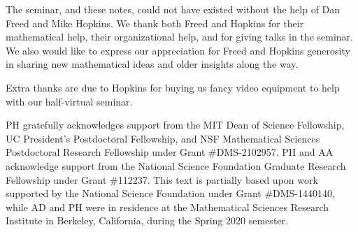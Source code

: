 The seminar, and these notes, could not have existed without the help of Dan Freed and Mike Hopkins. 
We thank both Freed and Hopkins for their mathematical help, their organizational help, and for giving talks in the seminar. 
We also would like to express our appreciation for Freed and Hopkins %
generosity in sharing new mathematical ideas and older insights along the way.

Extra thanks are due to Hopkins for buying us fancy video equipment to help with our half-virtual seminar.

PH gratefully acknowledges support from the MIT Dean of Science Fellowship, UC President's Postdoctoral Fellowship, and NSF Mathematical Sciences Postdoctoral Research Fellowship under Grant \#DMS-2102957. 
PH and AA acknowledge support from the National Science Foundation Graduate Research Fellowship under Grant \#112237.
This text is partially based upon work supported by the National Science Foundation under Grant \#DMS-1440140, while AD and PH were in residence at the Mathematical Sciences Research Institute in Berkeley, California, during the Spring 2020 semester.
